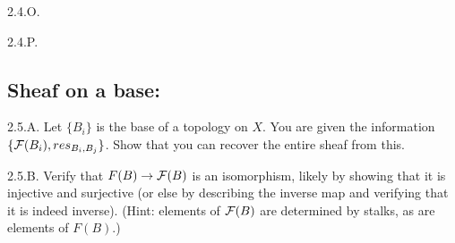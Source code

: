 \begin{exercise}{2.4.O.} 

\end{exercise}
\begin{solution}
    \todo{}

\end{solution}

\begin{exercise}{2.4.P.} 

\end{exercise}
\begin{solution}
    \todo{}

\end{solution}
\subsection{Sheaf on a base:}


\begin{exercise}{2.5.A.} 
    Let $\{B_i\}$ is the base of a topology on $X$. You are given the information $\{\mathcal{F}(B_i), res_{B_i, B_j} \}$. Show that you can recover the entire sheaf from this.
\end{exercise}
\begin{solution}
    \todo{}
\end{solution}

\begin{exercise}{2.5.B.}    
    Verify that $F(B) \to \mathcal{F}(B)$ is an isomorphism, likely by showing that it is injective and surjective (or else by describing the inverse map and verifying that it is indeed inverse). (Hint: elements of $\mathcal{F}(B)$ are determined by stalks, as are elements of $F(B)$.)
\end{exercise}
\begin{solution}
    \todo{}
\end{solution}

